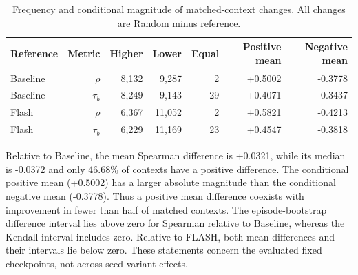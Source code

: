 \begin{table}[!htbp]
\centering
\small
\caption{Frequency and conditional magnitude of matched-context changes. All changes are Random minus reference.}
\label{tab:random11010_changes}
\begin{tabular}{lrrrrrr}
\toprule
Reference & Metric & Higher & Lower & Equal & Positive mean & Negative mean \\
\midrule
Baseline & $\rho$ & 8,132 & 9,287 & 2 & +0.5002 & -0.3778 \\
Baseline & $\tau_b$ & 8,249 & 9,143 & 29 & +0.4071 & -0.3437 \\
Flash & $\rho$ & 6,367 & 11,052 & 2 & +0.5821 & -0.4213 \\
Flash & $\tau_b$ & 6,229 & 11,169 & 23 & +0.4547 & -0.3818 \\
\bottomrule
\end{tabular}
\end{table}

Relative to Baseline, the mean Spearman difference is +0.0321, while its median is -0.0372 and only 46.68\% of contexts have a positive difference. The conditional positive mean (+0.5002) has a larger absolute magnitude than the conditional negative mean (-0.3778). Thus a positive mean difference coexists with improvement in fewer than half of matched contexts. The episode-bootstrap difference interval lies above zero for Spearman relative to Baseline, whereas the Kendall interval includes zero. Relative to FLASH, both mean differences and their intervals lie below zero. These statements concern the evaluated fixed checkpoints, not across-seed variant effects.

